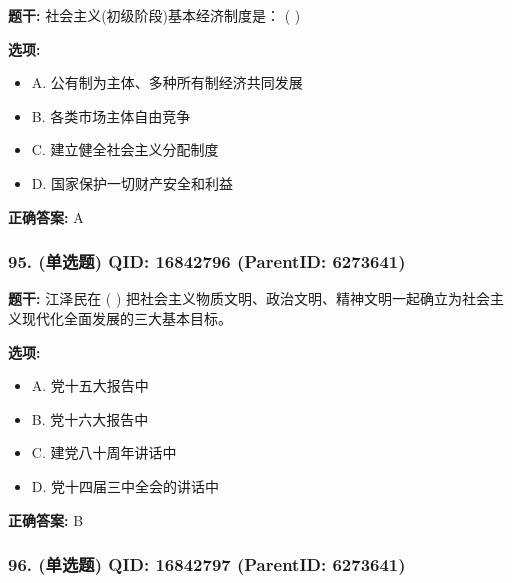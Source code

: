 \documentclass[12pt,UTF8]{ctexart}
\begin{document}
\textbf{题干:}
社会主义(初级阶段)基本经济制度是： ( )



\textbf{选项:}
\begin{itemize}[leftmargin=*]

  \item A. 公有制为主体、多种所有制经济共同发展

  \item B. 各类市场主体自由竞争

  \item C. 建立健全社会主义分配制度

  \item D. 国家保护一切财产安全和利益

\end{itemize}

\textbf{正确答案:}
A

\vspace{0.3em}\hrulefill\vspace{0.7em}

\subsubsection*{95. (单选题) \small QID: 16842796 (ParentID: 6273641)}

\textbf{题干:}
江泽民在 ( ) 把社会主义物质文明、政治文明、精神文明一起确立为社会主义现代化全面发展的三大基本目标。



\textbf{选项:}
\begin{itemize}[leftmargin=*]

  \item A. 党十五大报告中

  \item B. 党十六大报告中

  \item C. 建党八十周年讲话中

  \item D. 党十四届三中全会的讲话中

\end{itemize}

\textbf{正确答案:}
B

\vspace{0.3em}\hrulefill\vspace{0.7em}

\subsubsection*{96. (单选题) \small QID: 16842797 (ParentID: 6273641)}
\end{document}

